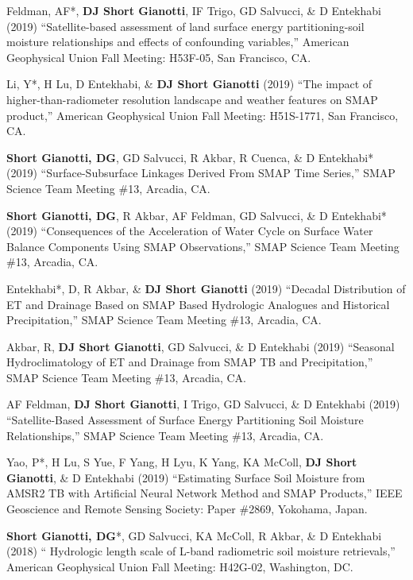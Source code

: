\documentclass[10pt, a4paper]{article}
\newcommand{\lbr}{\vspace*{12pt}}
\newcommand{\years}[1]{\mbox{}\marginnote{\scriptsize #1}} %
\begin{document}
\years{2019}Feldman, AF*, \textbf{DJ Short Gianotti}, IF Trigo, GD Salvucci, \& D Entekhabi (2019) ``Satellite-based assessment of land surface energy partitioning-soil moisture relationships and effects of confounding variables,'' American Geophysical Union Fall Meeting: H53F-05, San Francisco, CA.\lbr %

\years{2019}Li, Y*, H Lu, D Entekhabi, \& \textbf{DJ Short Gianotti} (2019) ``The impact of higher-than-radiometer resolution landscape and weather features on SMAP product,'' American Geophysical Union Fall Meeting: H51S-1771, San Francisco, CA.\lbr %

\years{2019}\textbf{Short Gianotti, DG}, GD Salvucci, R Akbar, R Cuenca, \& D Entekhabi* (2019) ``Surface-Subsurface Linkages Derived From SMAP Time Series,'' SMAP Science Team Meeting \#13, Arcadia, CA.\lbr %

\years{2019}\textbf{Short Gianotti, DG}, R Akbar, AF Feldman, GD Salvucci, \& D Entekhabi* (2019) ``Consequences of the Acceleration of Water Cycle on Surface Water Balance Components Using SMAP Observations,'' SMAP Science Team Meeting \#13, Arcadia, CA.\lbr %

\years{2019}Entekhabi*, D, R Akbar, \& \textbf{DJ Short Gianotti} (2019) ``Decadal Distribution of ET and Drainage Based on SMAP Based Hydrologic Analogues and Historical Precipitation,'' SMAP Science Team Meeting \#13, Arcadia, CA.\lbr %

\years{2019}Akbar, R, \textbf{DJ Short Gianotti}, GD Salvucci, \& D Entekhabi (2019) ``Seasonal Hydroclimatology of ET and Drainage from SMAP TB and Precipitation,'' SMAP Science Team Meeting \#13, Arcadia, CA.\lbr %

\years{2019}AF Feldman, \textbf{DJ Short Gianotti}, I Trigo, GD Salvucci, \& D Entekhabi (2019) ``Satellite-Based Assessment of Surface Energy Partitioning Soil Moisture Relationships,'' SMAP Science Team Meeting \#13, Arcadia, CA.\lbr %
 
\years{2019} Yao, P*, H Lu, S Yue, F Yang, H Lyu, K Yang, KA McColl, \textbf{DJ Short Gianotti}, \& D Entekhabi (2019) ``Estimating Surface Soil Moisture from AMSR2 TB with Artificial Neural Network Method and SMAP Products,'' IEEE Geoscience and Remote Sensing Society: Paper \#2869, Yokohama, Japan.\lbr 
 
\years{2018}\textbf{Short Gianotti, DG}*, GD Salvucci, KA McColl, R Akbar, \& D Entekhabi (2018) `` Hydrologic length scale of L-band radiometric soil moisture retrievals,'' American Geophysical Union Fall Meeting: H42G-02, Washington, DC.\lbr
\end{document}
